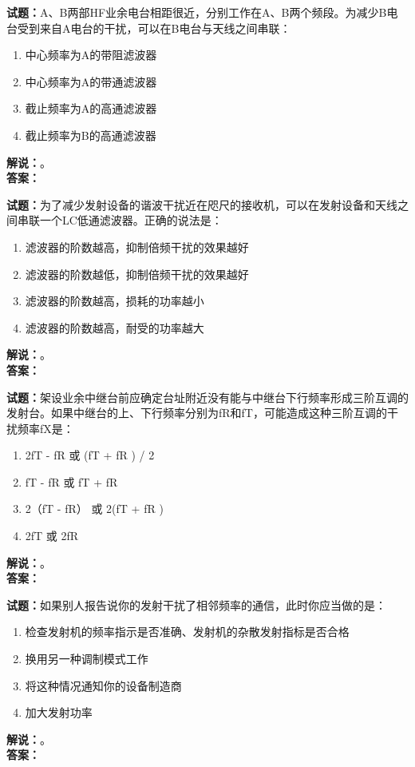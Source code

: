 \documentclass{ctexbook}
\begin{document}
\vspace{\baselineskip}

\noindent\textbf{试题：}A、B两部HF业余电台相距很近，分别工作在A、B两个频段。为减少B电台受到来自A电台的干扰，可以在B电台与天线之间串联：
\begin{enumerate}[leftmargin=3em]
  \item 中心频率为A的带阻滤波器
  \item 中心频率为A的带通滤波器
  \item 截止频率为A的高通滤波器
  \item 截止频率为B的高通滤波器
\end{enumerate}
\noindent\textbf{解说：}\textbf{}。\\\noindent\textbf{答案：}

\vspace{\baselineskip}

\noindent\textbf{试题：}为了减少发射设备的谐波干扰近在咫尺的接收机，可以在发射设备和天线之间串联一个LC低通滤波器。正确的说法是：
\begin{enumerate}[leftmargin=3em]
  \item 滤波器的阶数越高，抑制倍频干扰的效果越好
  \item 滤波器的阶数越低，抑制倍频干扰的效果越好
  \item 滤波器的阶数越高，损耗的功率越小
  \item 滤波器的阶数越高，耐受的功率越大
\end{enumerate}
\noindent\textbf{解说：}\textbf{}。\\\noindent\textbf{答案：}

\vspace{\baselineskip}

\noindent\textbf{试题：}架设业余中继台前应确定台址附近没有能与中继台下行频率形成三阶互调的发射台。如果中继台的上、下行频率分别为fR和fT，可能造成这种三阶互调的干扰频率fX是：
\begin{enumerate}[leftmargin=3em]
  \item 2fT - fR 或 (fT + fR ) / 2
  \item fT - fR 或 fT + fR
  \item 2（fT - fR） 或 2(fT + fR )
  \item 2fT 或 2fR
\end{enumerate}
\noindent\textbf{解说：}\textbf{}。\\\noindent\textbf{答案：}

\vspace{\baselineskip}

\noindent\textbf{试题：}如果别人报告说你的发射干扰了相邻频率的通信，此时你应当做的是：
\begin{enumerate}[leftmargin=3em]
  \item 检查发射机的频率指示是否准确、发射机的杂散发射指标是否合格
  \item 换用另一种调制模式工作
  \item 将这种情况通知你的设备制造商
  \item 加大发射功率
\end{enumerate}
\noindent\textbf{解说：}\textbf{}。\\\noindent\textbf{答案：}
\end{document}
